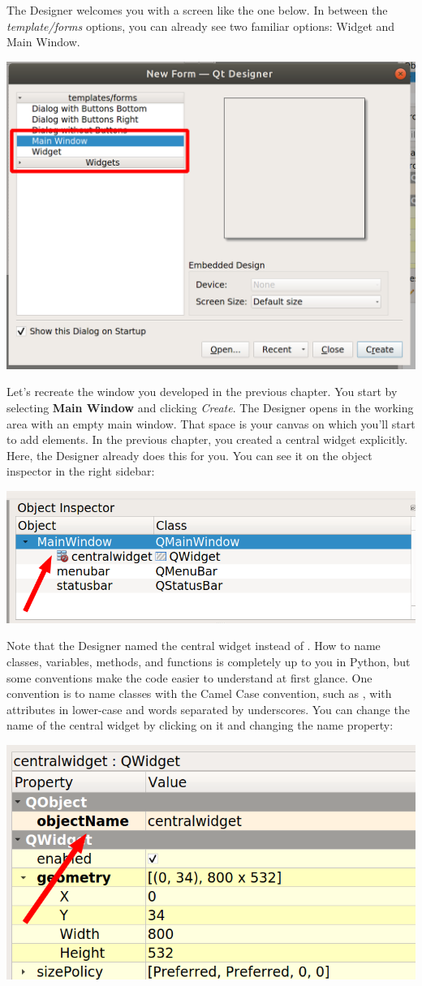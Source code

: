 The Designer welcomes you with a screen like the one below. In between the \textit{template/forms} options, you can already see two familiar options: Widget and Main Window.

\begin{center}
    \includegraphics[width=.5\textwidth]{images/Chapter_09/01_Designer_Welcome.png}
\end{center}

Let's recreate the window you developed in the previous chapter. You start by selecting \textbf{Main Window} and clicking \textit{Create}. The Designer opens in the working area with an empty main window. That space is your canvas on which you'll start to add elements. In the previous chapter, you created a central widget explicitly. Here, the Designer already does this for you. You can see it on the object inspector in the right sidebar:

\begin{center}
    \includegraphics[width=.5\textwidth]{images/Chapter_09/02_central_widget.png}
\end{center}

Note that the Designer named the central widget  instead of . How to name classes, variables, methods, and functions is completely up to you in Python, but some conventions make the code easier to understand at first glance. One convention is to name classes with the Camel Case convention, such as , with attributes in lower-case and words separated by underscores. You can change the name of the central widget by clicking on it and changing the  name property:

\begin{center}
    \includegraphics[width=.5\textwidth]{images/Chapter_09/03_central_widget_name.png}
\end{center}


